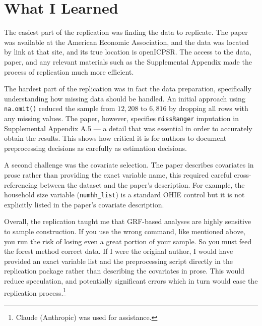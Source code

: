 \documentclass[12pt]{article}
\begin{document}
\section{What I Learned}

The easiest part of the replication was finding the data to replicate.
The paper was available at the American Economic Association, and the
data was located by link at that site, and its true location is openICPSR.
The access to the data, paper, and any relevant materials such as the
Supplemental Appendix made the process of replication much more efficient.

The hardest part of the replication was in fact the data preparation, specifically
understanding how missing data should be handled. An initial approach using
\texttt{na.omit()} reduced the sample from $12{,}208$ to $6{,}816$ by dropping all
rows with any missing values. The paper, however, specifies \texttt{missRanger}
imputation in Supplemental Appendix A.5 --- a detail that was essential in
order to accurately obtain the results. This shows how critical
it is for authors to document preprocessing decisions as carefully
as estimation decisions.

A second challenge was the covariate selection. The paper describes
covariates in prose rather than providing the exact variable name, this
required careful cross-referencing between the dataset and the paper's
description. For example, the household size variable (\texttt{numhh\_list})
is a standard OHIE control but it is not explicitly listed in the paper's
covariate description.

Overall, the replication taught me that GRF-based analyses are highly sensitive
to sample construction. If you use the wrong command, like mentioned above,
you run the risk of losing even a great portion of your sample. So you must
feed the forest method correct data. If I were the original author, I would have provided an
exact variable list and the preprocessing script directly in the replication
package rather than describing the covariates in prose. This would reduce
speculation, and potentially significant errors which in turn would ease the
replication process.\footnote{Claude (Anthropic) was used for assistance.}
\end{document}
